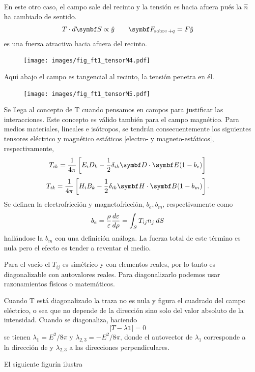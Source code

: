\documentclass[10pt,oneside]{CBFT_book}
\begin{document}
En este otro caso, el campo sale del recinto y la tensión es hacia afuera pués la $\hat{n}$
ha cambiado de sentido.
\[
	T\cdot d\vb{S} \propto \hat{y} \qquad \vb{F}_{\text{sobre}\:+q} = F\hat{y}
\]
es una fuerza atractiva hacia afuera del recinto.
\begin{figure}[htb]
	\begin{center}
	\texttt{[image: images/fig\_ft1\_tensorM4.pdf]}	 
	\end{center}
	\caption{}
\end{figure} 

Aquí abajo el campo es tangencial al recinto, la tensión penetra en él.

\begin{figure}[htb]
	\begin{center}
	\texttt{[image: images/fig\_ft1\_tensorM5.pdf]}	 
	\end{center}
	\caption{}
\end{figure} 

Se llega al concepto de T cuando pensamos en campos para justificar las interacciones.
Este concepto es válido también para el campo magnético.
Para medios materiales, lineales e isótropos, se tendrán consecuentemente los siguientes tensores
eléctrico y magnético estáticos [electro- y magneto-estáticos], respectivamente,
\[
	T_{ik} = \frac{1}{4\pi} \left[ E_iD_k - \frac{1}{2}\delta_{ik} \pe{D}{E}(1-b_e) \right] 
\]
\[
	T_{ik} = \frac{1}{4\pi} \left[ H_iB_k - \frac{1}{2}\delta_{ik} \pe{H}{B}(1-b_m)  \right] .
\]
Se definen la electrofricción y magnetofricción, $b_e,b_m$, respectivamente como
\[
	b_e = \frac{\rho}{\varepsilon} \frac{d^{\hspace{-0.05em}} {\varepsilon}}{d {\rho}^{\hspace{-0.05em}}}  = \int_S T_{ij} n_j \: dS
\]
hallándose la $b_m$ con una definición análoga.
La fuerza total de este término es nula pero el efecto es tender a reventar el medio.

Para el vacío el $T_{ij}$ es simétrico y con elementos reales, por lo tanto es diagonalizable 
con autovalores reales.
Para diagonalizarlo podemos usar razonamientos físicos o matemáticos.

Cuando T está diagonalizado la traza no es nula y figura el cuadrado del campo eléctrico,
o sea que no depende de la dirección sino solo del valor absoluto de la intensidad.
Cuando se diagonaliza, haciendo
\[
	| T - \lambda \mathbb{1} | = 0
\]
se tienen $\lambda_1 = E^2 / 8\pi$ y $\lambda_{2,3} = - E^2 / 8\pi$, donde el
autovector de $\lambda_1$ corresponde a la dirección de  y $\lambda_{2,3}$
a las direcciones perpendiculares.

El siguiente figurín ilustra
\end{document}
